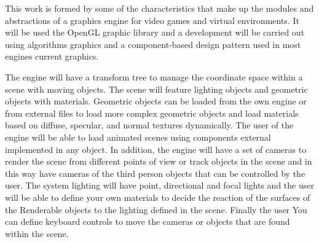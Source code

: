 \documentclass[a4paper, 17pt]{book}
\begin{document}
This work is formed by some of the characteristics that make up the modules
and abstractions of a graphics engine for video games and virtual environments. It will be used
the OpenGL graphic library and a development will be carried out using algorithms
graphics and a component-based design pattern used in most engines current graphics.

\vspace{1mm} %

The engine will have a transform tree to manage the coordinate space
within a scene with moving objects. The scene will feature lighting objects
and geometric objects with materials. Geometric objects can be loaded from the
own engine or from external files to load more complex geometric objects and
load materials based on diffuse, specular, and normal textures dynamically.
The user of the engine will be able to load animated scenes using components
external implemented in any object. In addition, the engine will have a set of
cameras to render the scene from different points of view
or track objects in the scene and in this way have cameras of the
third person objects that can be controlled by the user. The system
lighting will have point, directional and focal lights and the user will be able to
define your own materials to decide the reaction of the surfaces of the
Renderable objects to the lighting defined in the scene. Finally the user
You can define keyboard controls to move the cameras or objects that are found
within the scene.



\tableofcontents 
\cleardoublepage
\listoffigures %


\end{document}
